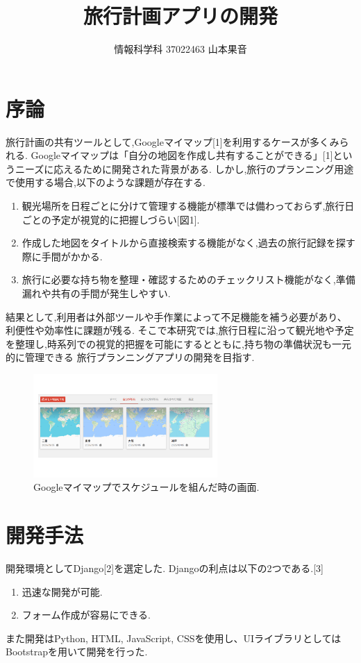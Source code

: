 \documentclass[a4j,twocolumn]{jsarticle}
\begin{document}
  \title{旅行計画アプリの開発}
  \author{情報科学科 \hspace{5mm} 37022463 \hspace{5mm} 山本果音}
  \date{}

  \maketitle


\section{序論}
\label{sec:org4856159}
旅行計画の共有ツールとして,Googleマイマップ[1]を利用するケースが多くみられる.
Googleマイマップは「自分の地図を作成し共有することができる」[1]というニーズに応えるために開発された背景がある.
しかし,旅行のプランニング用途で使用する場合,以下のような課題が存在する.
\begin{enumerate}
\item 観光場所を日程ごとに分けて管理する機能が標準では備わっておらず,旅行日ごとの予定が視覚的に把握しづらい[図1].
\item 作成した地図をタイトルから直接検索する機能がなく,過去の旅行記録を探す際に手間がかかる.
\item 旅行に必要な持ち物を整理・確認するためのチェックリスト機能がなく,準備漏れや共有の手間が発生しやすい.
\end{enumerate}
結果として,利用者は外部ツールや手作業によって不足機能を補う必要があり、利便性や効率性に課題が残る.
そこで本研究では,旅行日程に沿って観光地や予定を整理し,時系列での視覚的把握を可能にするとともに,持ち物の準備状況も一元的に管理できる
旅行プランニングアプリの開発を目指す.

\begin{figure}[htbp]
\centering
\includegraphics[width=7cm]{./figs/googlemymap1.png}
\caption{\label{fig:org3aeb999}Googleマイマップでスケジュールを組んだ時の画面.}
\end{figure}


\section{開発手法}
\label{sec:orgdf88e5d}
開発環境としてDjango[2]を選定した.
Djangoの利点は以下の2つである.[3]
\begin{enumerate}
\item 迅速な開発が可能.
\item フォーム作成が容易にできる.
\end{enumerate}
また開発はPython, HTML, JavaScript, CSSを使用し、UIライブラリとしてはBootstrapを用いて開発を行った.
\end{document}
